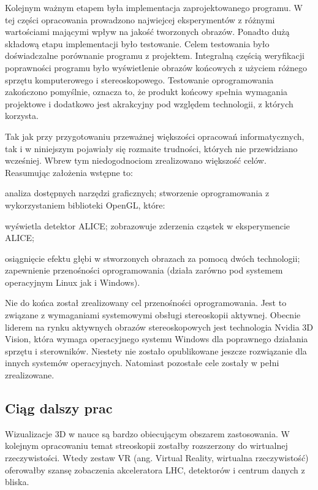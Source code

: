 Kolejnym ważnym etapem była implementacja zaprojektowanego programu. W tej części opracowania prowadzono najwiejcej eksperymentów z różnymi wartościami mającymi wpływ na jakość tworzonych obrazów. Ponadto dużą składową etapu implementacji było testowanie. Celem testowania było doświadczalne porównanie programu z projektem. Integralną częścią weryfikacji poprawności programu było wyświetlenie obrazów końcowych z użyciem różnego sprzętu komputerowego i stereoskopowego. Testowanie oprogramowania zakończono pomyślnie, oznacza to, że produkt końcowy spełnia wymagania projektowe i dodatkowo jest akrakcyjny pod względem technologii, z których korzysta.

Tak jak przy przygotowaniu przeważnej większości opracowań informatycznych, tak i w niniejszym pojawiały się rozmaite trudności, których nie przewidziano wcześniej. Wbrew tym niedogodnociom zrealizowano większość celów. Reasumując założenia wstępne to:
\begin{itemize}
\itemi analiza dostępnych narzędzi graficznych;
\itemi stworzenie oprogramowania z wykorzystaniem biblioteki OpenGL, które:
	\begin{itemize}
	\itemii wyświetla detektor ALICE;
	\itemii zobrazowuje zderzenia cząstek w eksperymencie ALICE;
	\end{itemize}
\itemi osiągnięcie efektu głębi w stworzonych obrazach za pomocą dwóch technologii;
\itemi zapewnienie przenośności oprogramowania (działa zarówno pod systemem operacyjnym Linux jak i Windows).
\end{itemize}

Nie do końca został zrealizowany cel przenośności oprogramowania. Jest to związane z wymaganiami systemowymi obsługi stereoskopii aktywnej. Obecnie liderem na rynku aktywnych obrazów stereoskopowych jest technologia Nvidia 3D Vision, która wymaga operacyjnego systemu Windows dla poprawnego działania sprzętu i sterowników. Niestety nie zostało opublikowane jeszcze rozwiązanie dla innych systemów operacyjnych. Natomiast pozostałe cele zostały w pełni zrealizowane. 

\subsection{Ciąg dalszy prac}
Wizualizacje 3D w nauce są bardzo obiecującym obszarem zastosowania. W kolejnym opracowaniu temat streoskopii zostałby rozszerzony do wirtualnej rzeczywistości. Wtedy zestaw VR (ang. Virtual Reality, wirtualna rzeczywistość) oferowałby szansę zobaczenia akceleratora LHC, detektorów i centrum danych z bliska.

